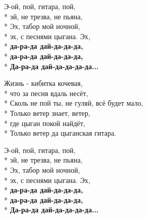 \medskip

\begin{minipage}{\linewidth}
\hspace*{1.5em}Э-ой, пой, гитара, пой,\\*
\hspace*{1.5em}эй, не трезва, не пьяна,\\*
\hspace*{1.5em}Эх, табор мой ночной,\\*
\hspace*{1.5em}эх, с песнями цыгана. Эх,\\*
\hspace*{1.5em}\textbf{да-ра-да дай-да-да-да,}\\*
\hspace*{1.5em}\textbf{да-ра-да дай-да-да-да,}\\*
\hspace*{1.5em}\textbf{Да-ра-да дай-да-да-да-да...}\\
\end{minipage}\par\medskip\nobreak

\medskip

\begin{minipage}{\linewidth}
Жизнь - кибитка кочевая,\\*
что за песня вдаль несёт,\\*
Сколь не пой ты, не гуляй, всё будет мало,\\*
Только ветер знает, ветер,\\*
где цыган покой найдёт,\\*
Только ветер да цыганская гитара.\\
\end{minipage}\par\medskip\nobreak

\medskip

\begin{minipage}{\linewidth}
\hspace*{1.5em}Э-ой, пой, гитара, пой,\\*
\hspace*{1.5em}эй, не трезва, не пьяна,\\*
\hspace*{1.5em}Эх, табор мой ночной,\\*
\hspace*{1.5em}эх, с песнями цыгана. Эх,\\*
\hspace*{1.5em}\textbf{да-ра-да дай-да-да-да,}\\*
\hspace*{1.5em}\textbf{да-ра-да дай-да-да-да,}\\*
\hspace*{1.5em}\textbf{Да-ра-да дай-да-да-да-да...}\\
\end{minipage}

